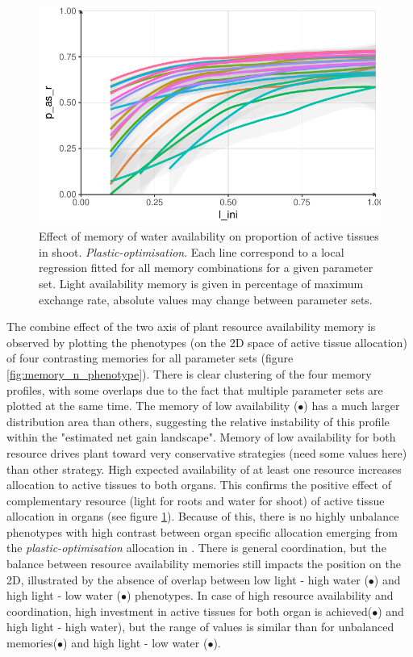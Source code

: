 \begin{figure}\label{fig:l_ini_p_as_r}
\includegraphics[width = \textwidth]{./2_PP/Figures/Individual/l_ini_p_as_r.pdf}
\caption{Effect of memory of water availability on proportion of active tissues in shoot. \textit{Plastic-optimisation}. Each line correspond to a local regression fitted for all memory combinations for a given parameter set. Light availability memory is given in percentage of maximum exchange rate, absolute values may change between parameter sets.}
\end{figure}

The combine effect of the two axis of plant resource availability memory is observed by plotting the phenotypes (on the 2D space of active tissue allocation) of four contrasting memories for all parameter sets (figure \ref{fig:memory_n_phenotype}). There is clear clustering of the four memory profiles, with some overlaps due to the fact that multiple parameter sets are plotted at the same time. The memory of low availability (\textcolor{myRed}{$\bullet$}) has a much larger distribution area than others, suggesting the relative instability of this profile within the "estimated net gain landscape". Memory of low availability for both resource drives plant toward very conservative strategies (need some values here) than other strategy. High expected availability of at least one resource increases allocation to active tissues to both organs. This confirms the positive effect of complementary resource (light for roots and water for shoot) of active tissue allocation in organs (see figure \ref{fig:l_ini_p_as_r}). Because of this, there is no highly unbalance phenotypes with high contrast between organ specific allocation emerging from the \textit{plastic-optimisation} allocation in \model. There is general coordination, but the balance between resource availability memories still impacts the position on the 2D, illustrated by the absence of overlap between low light - high water  (\textcolor{myBlue}{$\bullet$}) and high light - low water (\textcolor{myYellow}{$\bullet$}) phenotypes. In case of high resource availability and coordination, high investment in active tissues for both organ is achieved(\textcolor{myGreen}{$\bullet$}) and high light - high water), but the range of values is similar than for unbalanced memories(\textcolor{myBlue}{$\bullet$}) and high light - low water (\textcolor{myYellow}{$\bullet$}).

